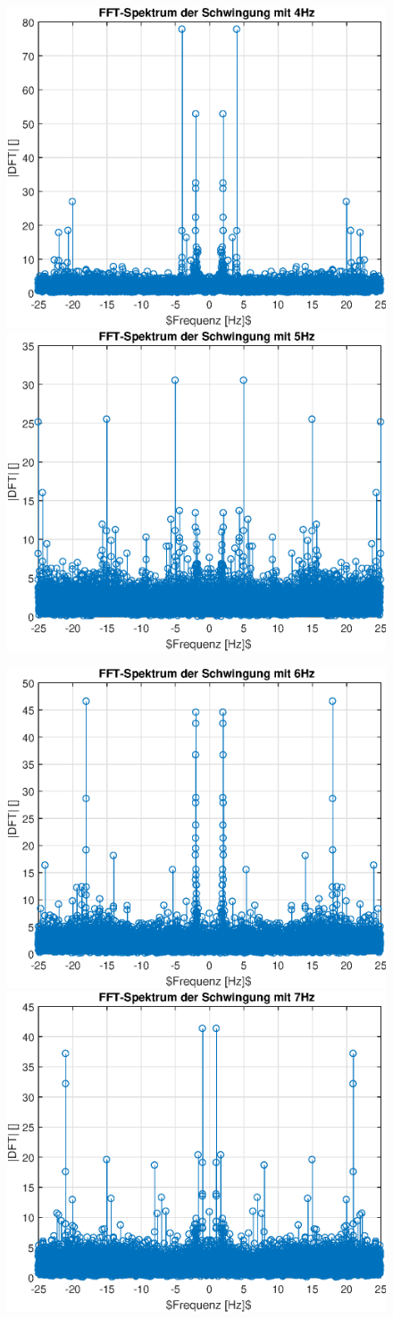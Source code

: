 \documentclass{article}
\begin{document}
\begin{figure}[!h]
\includegraphics[width=0.5\linewidth]{img/dft_sinefreq_4}
\includegraphics[width=0.5\linewidth]{img/dft_sinefreq_5}
\end{figure}
\begin{figure}[!h]
\includegraphics[width=0.5\linewidth]{img/dft_sinefreq_6}
\includegraphics[width=0.5\linewidth]{img/dft_sinefreq_7}
\end{figure}
\end{document}
